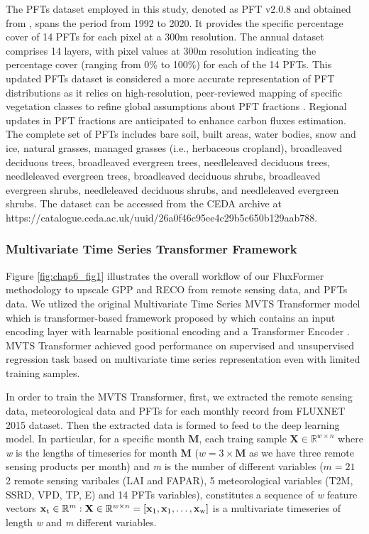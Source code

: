 The PFTs dataset employed in this study, denoted as PFT v2.0.8 and obtained from \citep{harper202229}, spans the period from 1992 to 2020. It provides the specific percentage cover of 14 PFTs for each pixel at a 300m resolution. The annual dataset comprises 14 layers, with pixel values at 300m resolution indicating the percentage cover (ranging from 0\% to 100\%) for each of the 14 PFTs. This updated PFTs dataset is considered a more accurate representation of PFT distributions as it relies on high-resolution, peer-reviewed mapping of specific vegetation classes to refine global assumptions about PFT fractions \citep{harper202229}. Regional updates in PFT fractions are anticipated to enhance carbon fluxes estimation. The complete set of PFTs includes bare soil, built areas, water bodies, snow and ice, natural grasses, managed grasses (i.e., herbaceous cropland), broadleaved deciduous trees, broadleaved evergreen trees, needleleaved deciduous trees, needleleaved evergreen trees, broadleaved deciduous shrubs, broadleaved evergreen shrubs, needleleaved deciduous shrubs, and needleleaved evergreen shrubs. The dataset can be accessed from the CEDA archive at https://catalogue.ceda.ac.uk/uuid/26a0f46c95ee4c29b5c650b129aab788.\par

\subsubsection{Multivariate Time Series Transformer Framework}
Figure \ref{fig:chap6_fig1} illustrates the overall workflow of our FluxFormer methodology to upscale GPP and RECO from remote sensing data, and PFTs data. We utlized the original Multivariate Time Series MVTS Transformer model which is transformer-based framework proposed by \citep{zerveas2021transformer} which contains an input encoding layer with learnable positional encoding and a Transformer Encoder \citep{vaswani2017attention}. MVTS Transformer achieved good performance on supervised and unsupervised regression task based on multivariate time series representation even with limited training samples.  \par
In order to train the MVTS Transformer, first, we extracted the remote sensing data, meteorological data and PFTs for each monthly record from FLUXNET 2015 dataset. Then the extracted data is formed to feed to the deep learning model. In particular, for a specific month \textbf{M}, each traing sample $\mathbf{X} \in \mathbb{R}^{w\times n}$ where \textit{w} is the lengths of timeseries for month \textbf{M} ($\textit{w} = 3\times \textbf{M}$ as we have three remote sensing products per month) and \textit{m} is the number of different variables ($\textit{m} = 21$ 2 remote sensing varibales (LAI and FAPAR), 5 meteorological variables (T2M, SSRD, VPD, TP, E) and 14 PFTs variables), constitutes a sequence of \textit{w} feature vectors $\mathbf{x}\textsubscript{t} \in \mathbb{R}^{m}: \mathbf{X} \in \mathbb{R}^{w\times n} = [\mathbf{x}\textsubscript{1},\mathbf{x}\textsubscript{1}, \dots, \mathbf{x}\textsubscript{w}]$ is a multivariate timeseries of length \textit{w} and \textit{m} different variables. \par

